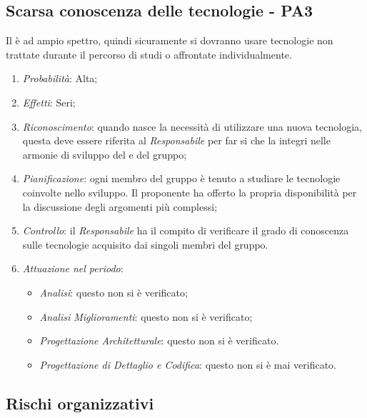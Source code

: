 \subsection{Scarsa conoscenza delle tecnologie - PA3}
Il  \`e ad ampio spettro, quindi sicuramente si dovranno usare tecnologie non trattate durante il percorso di studi o affrontate individualmente.
\begin{enumerate}
\item \textit{Probabilit\`a}: Alta;
\item \textit{Effetti}: Seri;
\item \textit{Riconoscimento}: quando nasce la necessità di utilizzare una nuova tecnologia, questa deve essere riferita al \textit{Responsabile} per far si che la integri nelle armonie di sviluppo del  e del gruppo;
\item \textit{Pianificazione}: ogni membro del gruppo \`e tenuto a studiare le tecnologie coinvolte nello sviluppo. Il proponente ha offerto la propria disponibilit\`a per la discussione degli argomenti pi\`u complessi;
\item \textit{Controllo}: il \textit{Responsabile} ha il compito di verificare il grado di conoscenza sulle tecnologie acquisito dai singoli membri del gruppo.
\item \textit{Attuazione nel periodo}: 
	\begin{itemize}
	\item \textit{Analisi}: questo  non si è verificato;
	\item \textit{Analisi Miglioramenti}: questo  non si è verificato;
	\item \textit{Progettazione Architetturale}: questo  non si è verificato.
	\item \textit{Progettazione di Dettaglio e Codifica}: questo  non si è mai verificato.
	\end{itemize}
\end{enumerate}

\subsection{Rischi organizzativi}
